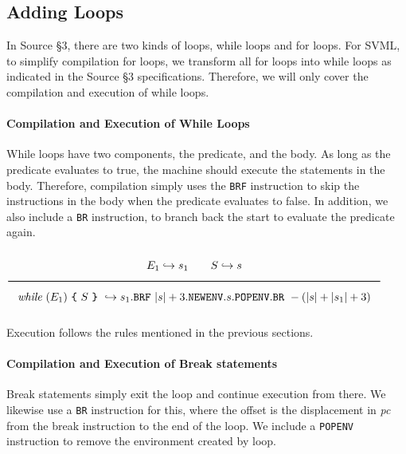 
\newcommand{\qed}{$\Box$}
\newcommand{\Rule}[2]{\genfrac{}{}{0.7pt}{}{{\setlength{\fboxrule}{0pt}\setlength{\fboxsep}{3mm}\fbox{$#1$}}}{{\setlength{\fboxrule}{0pt}\setlength{\fboxsep}{3mm}\fbox{$#2$}}}}
\newcommand{\Rulee}[3]{\genfrac{}{}{0.7pt}{}{{\setlength{\fboxrule}{0pt}\setlength{\fboxsep}{3mm}\fbox{$#1$}}}{{\setlength{\fboxrule}{0pt}\setlength{\fboxsep}{3mm}\fbox{$#2$}}}[#3]}
\newcommand{\transition}{\rightrightarrows_s}
\newcommand{\translate}{\twoheadrightarrow}
\newcommand{\translateaux}{\hookrightarrow}
\newcommand{\Lc}{\texttt{\{}}
\newcommand{\Rc}{\texttt{\}}}

\subsection{Adding Loops}

In Source §3, there are two kinds of loops, while loops and for loops.
For SVML, to simplify compilation for loops, we transform all for loops into while loops as
indicated in the Source §3 specifications. Therefore, we will only cover
the compilation and execution of while loops.

\paragraph{Compilation and Execution of While Loops}
While loops have two components, the predicate, and the body. As long as the
predicate evaluates to true, the machine should execute the statements in the body.
Therefore, compilation simply uses the \texttt{BRF} instruction to skip
the instructions in the body when the predicate evaluates to false.
In addition, we also include a \texttt{BR} instruction, to branch back
the start to evaluate the predicate again.

$\Rule{
E_1 \translateaux s_1 \qquad S \translateaux s}
{\textit{while}\ (E_1)\ \Lc\ S\ \Rc\ \translateaux s_1
.\texttt{BRF}\ |s|+3.\texttt{NEWENV}.s.\texttt{POPENV}
.\texttt{BR}\ -(|s|+|s_1|+3)}
$

Execution follows the rules mentioned in the previous sections.

\paragraph{Compilation and Execution of Break statements}
Break statements simply exit the loop and continue execution from there.
We likewise use a \texttt{BR} instruction for this, where the offset
is the displacement in \textit{pc} from the break instruction to the end
of the loop. We include a
\texttt{POPENV} instruction to remove the environment created by loop.

